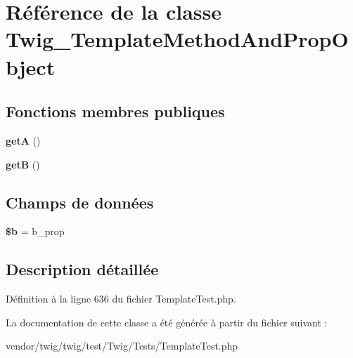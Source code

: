 \hypertarget{class_twig___template_method_and_prop_object}{}\section{Référence de la classe Twig\+\_\+\+Template\+Method\+And\+Prop\+Object}
\label{class_twig___template_method_and_prop_object}
\subsection*{Fonctions membres publiques}
\begin{DoxyCompactItemize}
\item 
{\bfseries getA} ()\hypertarget{class_twig___template_method_and_prop_object_af3267c0aeee43c2d557368132ee1877e}{}\label{class_twig___template_method_and_prop_object_af3267c0aeee43c2d557368132ee1877e}

\item 
{\bfseries getB} ()\hypertarget{class_twig___template_method_and_prop_object_abe10266f5d4aa48a1ba5efc3ac1563ae}{}\label{class_twig___template_method_and_prop_object_abe10266f5d4aa48a1ba5efc3ac1563ae}

\end{DoxyCompactItemize}
\subsection*{Champs de données}
\begin{DoxyCompactItemize}
\item 
{\bfseries \$b} = \textquotesingle{}b\+\_\+prop\textquotesingle{}\hypertarget{class_twig___template_method_and_prop_object_ab9eb087b791749ae45deabb0899b7ccc}{}\label{class_twig___template_method_and_prop_object_ab9eb087b791749ae45deabb0899b7ccc}

\end{DoxyCompactItemize}


\subsection{Description détaillée}


Définition à la ligne 636 du fichier Template\+Test.\+php.



La documentation de cette classe a été générée à partir du fichier suivant \+:\begin{DoxyCompactItemize}
\item 
vendor/twig/twig/test/\+Twig/\+Tests/Template\+Test.\+php\end{DoxyCompactItemize}
